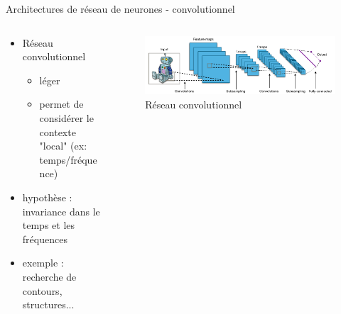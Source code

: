 \documentclass[9pt, aspectratio=169]{beamer}
\begin{document}
\begin{frame}{Architectures de réseau de neurones - convolutionnel} %
\begin{columns}
    \begin{column}{0.48\textwidth}

\begin{itemize}
	\item Réseau convolutionnel \cite{gu_recent_2018}
	\begin{itemize}
		\item léger
		\item permet de considérer le contexte "local" (ex: temps/fréquence)
	\end{itemize}
	\item hypothèse : invariance dans le temps et les fréquences
	\item exemple : recherche de contours, structures...
	
\end{itemize}

    \end{column}
    \begin{column}{0.48\textwidth}

	
    \begin{figure}
		\includegraphics[width=\textwidth]{fig/cnn.png}
		\caption{Réseau convolutionnel}
	\end{figure}
	
    \end{column}
\end{columns}

\end{frame}
\end{document}
